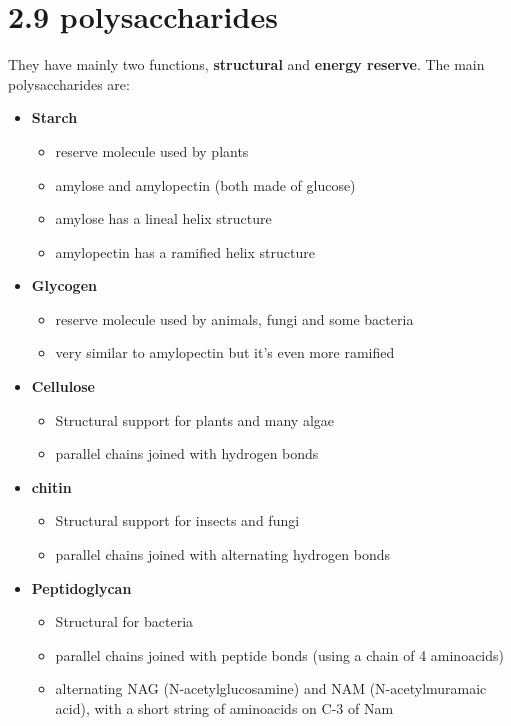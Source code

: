 \documentclass[a4paper,landscape,10pt]{cheatsheet}
\begin{document}
\section*{2.9 polysaccharides}
They have mainly two functions, \textbf{structural} and \textbf{energy reserve}. The main polysaccharides are:
\begin{itemize}
  \item \textbf{Starch}
        \begin{itemize}
          \item reserve molecule used by plants
          \item amylose and amylopectin (both made of glucose)
          \item amylose has a lineal helix structure
          \item amylopectin has a ramified helix structure
        \end{itemize}
  \item \textbf{Glycogen}
        \begin{itemize}
          \item reserve molecule used by animals, fungi and some bacteria
          \item very similar to amylopectin but it's even more ramified
        \end{itemize}
  \item \textbf{Cellulose}
        \begin{itemize}
          \item Structural support for plants and many algae
          \item parallel chains joined with hydrogen bonds
        \end{itemize}
  \item \textbf{chitin}
        \begin{itemize}
          \item Structural support for insects and fungi
          \item parallel chains joined with alternating hydrogen bonds
        \end{itemize}
  \item \textbf{Peptidoglycan}
        \begin{itemize}
          \item Structural for bacteria
          \item parallel chains joined with peptide bonds (using a chain of 4 aminoacids)
          \item alternating NAG (N-acetylglucosamine) and NAM (N-acetylmuramaic acid), with a short string of aminoacids
                on C-3 of Nam
        \end{itemize}
\end{itemize}
\end{document}
